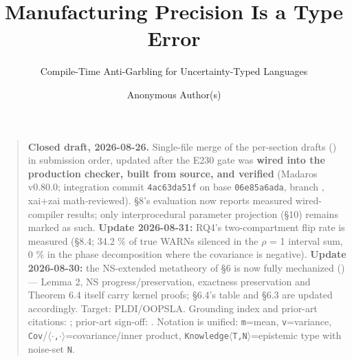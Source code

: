 \documentclass[sigplan,review,anonymous,10pt]{acmart}
\title{Manufacturing Precision Is a Type Error}
\subtitle{Compile-Time Anti-Garbling for Uncertainty-Typed Languages}
\author{Anonymous Author(s)}
\begin{document}
\begin{quote}
\textbf{Closed draft, 2026-08-26.} Single-file merge of the per-section drafts () in submission order, updated after the E230 gate was \textbf{wired into the production checker, built from source, and verified} (Madaros v0.80.0; integration commit \texttt{4ac63da51f} on base \texttt{06e85a6ada}, branch , xai+zai math-reviewed). §8's evaluation now reports measured wired-compiler results; only interprocedural parameter projection (§10) remains marked as such. \textbf{Update 2026-08-31:} RQ4's two-compartment flip rate is measured (§8.4; 34.2 \% of true WARNs silenced in the $\rho$ = 1 interval sum, 0 \% in the phase decomposition where the covariance is negative). \textbf{Update 2026-08-30:} the NS-extended metatheory of §6 is now fully mechanized () --- Lemma 2, NS progress/preservation, exactness preservation and Theorem 6.4 itself carry kernel proofs; §6.4's table and §6.3 are updated accordingly. Target: PLDI/OOPSLA. Grounding index and prior-art citations: ; prior-art sign-off: . Notation is unified: \texttt{m}=mean, \texttt{v}=variance, \texttt{Cov}/\texttt{$\langle\cdot$,$\cdot\rangle$}=covariance/inner product, \texttt{Knowledge$\langle$T,N$\rangle$}=epistemic type with noise-set \texttt{N}.
\end{quote}
\end{document}
